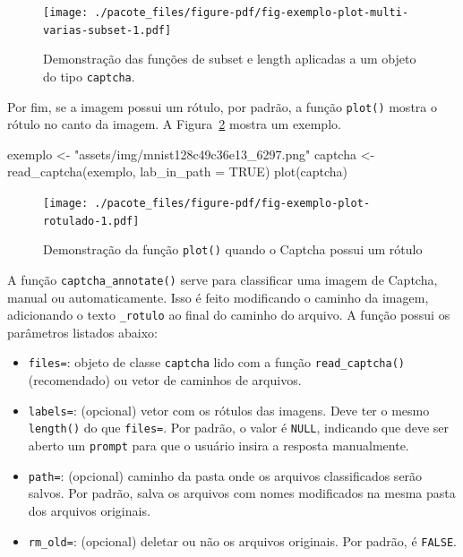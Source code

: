 \documentclass[12pt,twoside,brazilian]{book}
\newenvironment{Shaded}{\begin{snugshade}}{\end{snugshade}}
\newcommand{\AttributeTok}[1]{\textcolor[rgb]{0.40,0.45,0.13}{#1}}
\newcommand{\ConstantTok}[1]{\textcolor[rgb]{0.56,0.35,0.01}{#1}}
\newcommand{\FunctionTok}[1]{\textcolor[rgb]{0.28,0.35,0.67}{#1}}
\newcommand{\NormalTok}[1]{\textcolor[rgb]{0.00,0.23,0.31}{#1}}
\newcommand{\OtherTok}[1]{\textcolor[rgb]{0.00,0.23,0.31}{#1}}
\newcommand{\StringTok}[1]{\textcolor[rgb]{0.13,0.47,0.30}{#1}}
\providecommand{\tightlist}{%
  \setlength{\itemsep}{0pt}\setlength{\parskip}{0pt}}
\begin{document}
\begin{figure}[H]

{\centering \texttt{[image: ./pacote\_files/figure-pdf/fig-exemplo-plot-multi-varias-subset-1.pdf]}

}

\caption{\label{fig-exemplo-plot-multi-varias-subset}Demonstração das
funções de subset e length aplicadas a um objeto do tipo
\texttt{captcha}.}

\end{figure}

Por fim, se a imagem possui um rótulo, por padrão, a função
\texttt{plot()} mostra o rótulo no canto da imagem. A
Figura~\ref{fig-exemplo-plot-rotulado} mostra um exemplo.

\begin{Shaded}
\begin{Highlighting}[]
\NormalTok{exemplo }\OtherTok{\textless{}{-}} \StringTok{"assets/img/mnist128c49c36e13\_6297.png"}
\NormalTok{captcha }\OtherTok{\textless{}{-}} \FunctionTok{read\_captcha}\NormalTok{(exemplo, }\AttributeTok{lab\_in\_path =} \ConstantTok{TRUE}\NormalTok{)}
\FunctionTok{plot}\NormalTok{(captcha)}
\end{Highlighting}
\end{Shaded}

\begin{figure}[H]

{\centering \texttt{[image: ./pacote\_files/figure-pdf/fig-exemplo-plot-rotulado-1.pdf]}

}

\caption{\label{fig-exemplo-plot-rotulado}Demonstração da função
\texttt{plot()} quando o Captcha possui um rótulo}

\end{figure}

A função \texttt{captcha\_annotate()} serve para classificar uma imagem
de Captcha, manual ou automaticamente. Isso é feito modificando o
caminho da imagem, adicionando o texto \texttt{\_rotulo} ao final do
caminho do arquivo. A função possui os parâmetros listados abaixo:

\begin{itemize}
\tightlist
\item
  \texttt{files=}: objeto de classe \texttt{captcha} lido com a função
  \texttt{read\_captcha()} (recomendado) ou vetor de caminhos de
  arquivos.
\item
  \texttt{labels=}: (opcional) vetor com os rótulos das imagens. Deve
  ter o mesmo \texttt{length()} do que \texttt{files=}. Por padrão, o
  valor é \texttt{NULL}, indicando que deve ser aberto um
  \texttt{prompt} para que o usuário insira a resposta manualmente.
\item
  \texttt{path=}: (opcional) caminho da pasta onde os arquivos
  classificados serão salvos. Por padrão, salva os arquivos com nomes
  modificados na mesma pasta dos arquivos originais.
\item
  \texttt{rm\_old=}: (opcional) deletar ou não os arquivos originais.
  Por padrão, é \texttt{FALSE}.
\end{itemize}
\end{document}
